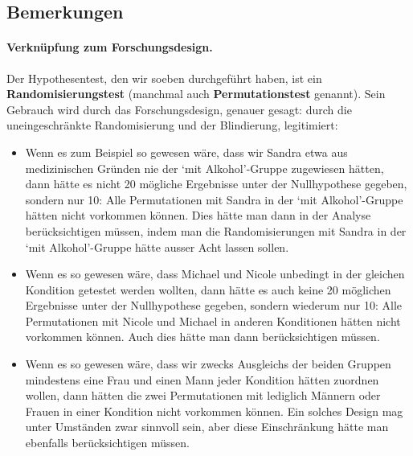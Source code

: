 \documentclass[oneside, 10pt]{book}\usepackage[]{graphicx}\usepackage[]{xcolor}
\begin{document}
\subsection{Bemerkungen}
\paragraph{Verknüpfung zum Forschungsdesign.}
Der Hypothesentest, den wir soeben durchgeführt haben,
ist ein \textbf{Randomisierungstest} (manchmal auch \textbf{Permutationstest}
genannt). Sein Gebrauch wird
durch das Forschungsdesign, genauer gesagt: durch
die uneingeschränkte Randomisierung und der Blindierung,
legitimiert:

\begin{itemize}
\item Wenn es zum Beispiel so gewesen wäre,
dass wir Sandra etwa aus medizinischen Gründen nie der
`mit Alkohol'-Gruppe zugewiesen hätten, dann hätte es nicht
20 mögliche Ergebnisse unter der Nullhypothese gegeben, sondern
nur 10: Alle Permutationen mit Sandra in der `mit Alkohol'-Gruppe
hätten nicht vorkommen können. Dies hätte man dann in der
Analyse berücksichtigen müssen, indem man die Randomisierungen
mit Sandra in der `mit Alkohol'-Gruppe hätte ausser Acht lassen sollen.

\item Wenn es so gewesen wäre, dass Michael
und Nicole unbedingt in der gleichen Kondition getestet werden
wollten, dann hätte es auch keine 20 möglichen Ergebnisse
unter der Nullhypothese gegeben, sondern wiederum nur 10:
Alle Permutationen mit Nicole und Michael in anderen Konditionen
hätten nicht vorkommen können. Auch dies hätte man dann
berücksichtigen müssen.

\item Wenn es so gewesen wäre, dass wir zwecks Ausgleichs
der beiden Gruppen mindestens eine Frau und einen Mann
jeder Kondition hätten zuordnen wollen, dann hätten die
zwei Permutationen mit lediglich Männern oder Frauen in einer
Kondition nicht vorkommen können. Ein solches Design mag
unter Umständen zwar sinnvoll sein, aber diese Einschränkung
hätte man ebenfalls berücksichtigen müssen.
\end{itemize}
\end{document}
